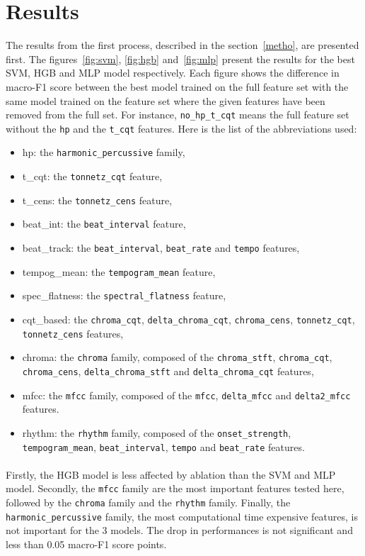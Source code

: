 \documentclass[11pt]{article}
\begin{document}
\section{Results}

The results from the first process, described in the section~\ref{metho}, are presented first. The figures~\ref{fig:svm}, \ref{fig:hgb} and~\ref{fig:mlp} present the results for the best SVM, HGB and MLP model respectively.
Each figure shows the difference in macro-F1 score between the best model trained on the full feature set with the same model trained on the feature set where the given features have been removed from the full set. For instance, \texttt{no\_hp\_t\_cqt} means the full feature set without the \texttt{hp} and the \texttt{t\_cqt} features. Here is the list of the abbreviations used:
\begin{itemize}
\item hp: the \texttt{harmonic\_percussive} family,
\item t\_cqt: the \texttt{tonnetz\_cqt} feature,
\item t\_cens: the \texttt{tonnetz\_cens} feature,
\item beat\_int: the \texttt{beat\_interval} feature,
\item beat\_track: the \texttt{beat\_interval}, \texttt{beat\_rate} and \texttt{tempo} features,
\item tempog\_mean: the \texttt{tempogram\_mean} feature,
\item spec\_flatness: the \texttt{spectral\_flatness} feature,
\item cqt\_based: the \texttt{chroma\_cqt}, \texttt{delta\_chroma\_cqt}, \texttt{chroma\_cens}, \texttt{tonnetz\_cqt}, \texttt{tonnetz\_cens} features,
\item chroma: the \texttt{chroma} family, composed of the \texttt{chroma_stft}, \texttt{chroma_cqt}, \texttt{chroma_cens}, \texttt{delta_chroma_stft} and \texttt{delta_chroma_cqt} features,
\item mfcc: the \texttt{mfcc} family, composed of the \texttt{mfcc}, \texttt{delta\_mfcc} and \texttt{delta2\_mfcc} features.
\item rhythm: the \texttt{rhythm} family, composed of the \texttt{onset_strength}, \texttt{tempogram_mean}, \texttt{beat_interval}, \texttt{tempo} and \texttt{beat_rate} features.
\end{itemize}

\paragraph{}
Firstly, the HGB model is less affected by ablation than the SVM and MLP model. Secondly, the \texttt{mfcc} family are the most important features tested here, followed by the \texttt{chroma} family and the \texttt{rhythm} family. Finally, the \texttt{harmonic\_percussive} family, the most computational time expensive features, is not important for the 3 models. The drop in performances is not significant and less than 0.05 macro-F1 score points.
\end{document}

